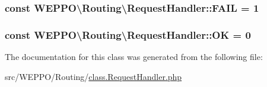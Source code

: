 \subsubsection[{\texorpdfstring{F\+A\+IL}{FAIL}}]{\setlength{\rightskip}{0pt plus 5cm}const W\+E\+P\+P\+O\textbackslash{}\+Routing\textbackslash{}\+Request\+Handler\+::\+F\+A\+IL = 1}\hypertarget{classWEPPO_1_1Routing_1_1RequestHandler_a881ac6ebc505c9427b362b99573d3dd3}{}\label{classWEPPO_1_1Routing_1_1RequestHandler_a881ac6ebc505c9427b362b99573d3dd3}
\subsubsection[{\texorpdfstring{OK}{OK}}]{\setlength{\rightskip}{0pt plus 5cm}const W\+E\+P\+P\+O\textbackslash{}\+Routing\textbackslash{}\+Request\+Handler\+::\+OK = 0}\hypertarget{classWEPPO_1_1Routing_1_1RequestHandler_a2c5d97348177dbc8665d5f4acf76b869}{}\label{classWEPPO_1_1Routing_1_1RequestHandler_a2c5d97348177dbc8665d5f4acf76b869}


The documentation for this class was generated from the following file\+:\begin{DoxyCompactItemize}
\item 
src/\+W\+E\+P\+P\+O/\+Routing/\hyperlink{class_8RequestHandler_8php}{class.\+Request\+Handler.\+php}\end{DoxyCompactItemize}
